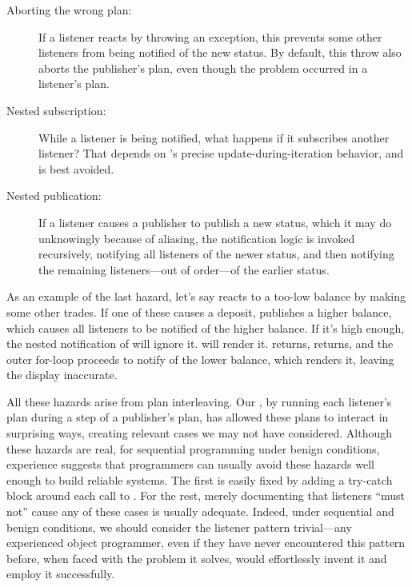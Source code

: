 \documentclass{llncs}
\begin{document}
\begin{description}
\item[Aborting the wrong plan:] If a listener reacts by throwing an
exception, this prevents some other listeners from being notified of
the new status. By default, this throw also aborts the publisher's
plan, even though the problem occurred in a listener's plan.

\item[Nested subscription:] While a listener is being notified, what
happens if it subscribes another listener? That depends on 's
precise update-during-iteration behavior, and is best avoided.

\item[Nested publication:] If a listener causes a publisher to publish
a new status, which it may do unknowingly because of aliasing, the
notification logic is invoked recursively, notifying all listeners of
the newer status, and then notifying the remaining listeners---out
of order---of the earlier status.
\end{description}

As an example of the last hazard, let's say  reacts to a too-low
balance by making some other trades. If one of these causes a deposit,
 publishes a higher balance, which causes all listeners to be
notified of the higher balance. If it's high enough, the nested
notification of  will ignore it.  will render it.
 returns,  returns, and the outer for-loop proceeds
to notify  of the lower balance, which renders it, leaving the
display inaccurate.

All these hazards arise from plan interleaving. Our , by
running each listener's plan during a step of a publisher's plan, has
allowed these plans to interact in surprising ways, creating relevant
cases we may not have considered. Although these hazards are real, for
sequential programming under benign conditions, experience suggests
that programmers can usually avoid these hazards well enough to build
reliable systems. The first is easily fixed by adding a try-catch
block around each call to . For the rest, merely
documenting that listeners ``must not'' cause any of these cases is
usually adequate. Indeed, under sequential and benign conditions, we
should consider the listener pattern trivial---any experienced object
programmer, even if they have never encountered this pattern before,
when faced with the problem it solves, would effortlessly invent it
and employ it successfully.
\end{document}
